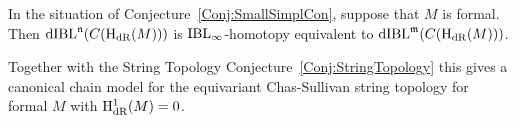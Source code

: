 \documentclass[\MainFolder/Text.tex]{subfiles}
\begin{document}
\begin{Corollary}\label{Cor:FormCorollary}
In the situation of Conjecture~\ref{Conj:SmallSimplCon}, suppose that $M$ is formal. Then $\mathrm{dIBL}^{\mathfrak{n}}(C(\mathrm{H}_{\mathrm{dR}}(M)))$ is $\mathrm{IBL}_\infty$-homotopy equivalent to $\mathrm{dIBL}^{\mathfrak{m}}(C(\mathrm{H}_{\mathrm{dR}}(M)))$.
\end{Corollary}

Together with the String Topology Conjecture~\ref{Conj:StringTopology} this gives a canonical chain model for the equivariant Chas-Sullivan string topology for formal $M$ with $\mathrm{H}_{\mathrm{dR}}^1(M)=0$.

%
%
\end{document}
